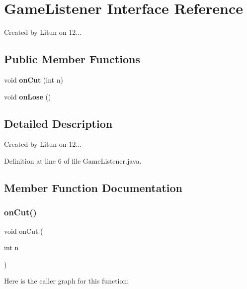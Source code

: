 \section{Game\+Listener Interface Reference}
\label{interfaceru_1_1litun_1_1unitingtwist_1_1_game_listener}


Created by Litun on 12...  


\subsection*{Public Member Functions}
\begin{DoxyCompactItemize}
\item 
void \textbf{ on\+Cut} (int n)
\item 
void \textbf{ on\+Lose} ()
\end{DoxyCompactItemize}


\subsection{Detailed Description}
Created by Litun on 12... 

Definition at line 6 of file Game\+Listener.\+java.



\subsection{Member Function Documentation}
\mbox{\label{interfaceru_1_1litun_1_1unitingtwist_1_1_game_listener_ac9f99a8933b01d99f8e7b23f4f871a23}} 
\subsubsection{on\+Cut()}
{\footnotesize\ttfamily void on\+Cut (\begin{DoxyParamCaption}\item[{int}]{n }\end{DoxyParamCaption})}

Here is the caller graph for this function\+:
\mbox{\label{interfaceru_1_1litun_1_1unitingtwist_1_1_game_listener_ad3a588cbd6aa6344ad9a032223571669}} 
